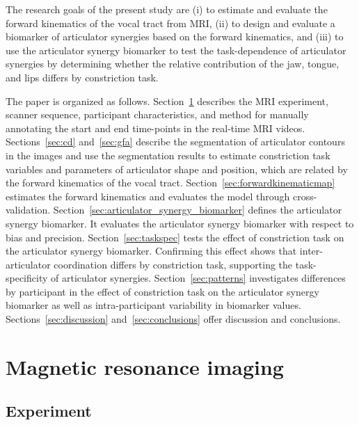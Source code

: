 \documentclass[preprint]{JASAnew}\usepackage[]{graphicx}\usepackage[]{color}
\begin{document}
The research goals of the present study are 
%
(i) to estimate and evaluate the forward kinematics of the vocal tract from MRI, 
%
(ii) to design and evaluate a biomarker of articulator synergies based on the forward kinematics, and
%
(iii) to use the articulator synergy biomarker to test the task-dependence of articulator synergies by determining whether the relative contribution of the jaw, tongue, and lips differs by constriction task. 


The paper is organized as follows.
%
Section~\ref{sec:mri} describes the MRI experiment, scanner sequence, participant characteristics, and method for manually annotating the start and end time-points in the real-time MRI videos. 
Sections~\ref{sec:cd} and~\ref{sec:gfa} describe the segmentation of articulator contours in the images and use the segmentation results to estimate constriction task variables and parameters of articulator shape and position, which are related by the forward kinematics of the vocal tract. 
Section~\ref{sec:forwardkinematicmap} estimates the forward kinematics and evaluates the model through cross-validation. 
Section~\ref{sec:articulator_synergy_biomarker} defines the articulator synergy biomarker. It evaluates the articulator synergy biomarker with respect to bias and precision. 
Section~\ref{sec:taskspec} tests the effect of constriction task on the articulator synergy biomarker. Confirming this effect shows that inter-articulator coordination differs by constriction task, supporting the task-specificity of articulator synergies. 
Section~\ref{sec:patterns} investigates differences by participant in the effect of constriction task on the articulator synergy biomarker as well as intra-participant variability in biomarker values.
Sections~\ref{sec:discussion} and~\ref{sec:conclusions} offer discussion and conclusions.



\section{Magnetic resonance imaging}
\label{sec:mri}

\subsection{Experiment}
\label{subsec:experimentdescription}
\end{document}
